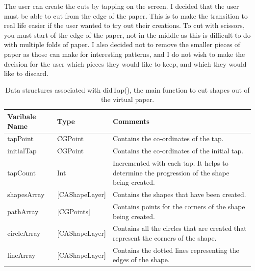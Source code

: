 \documentclass[11pt]{article}
\begin{document}
                 The user can create the cuts by tapping on the screen. I decided that the user must be able to cut from the edge of the paper. This is to make the transition to real life easier if the user wanted to try out their creations. To cut with scissors, you must start of the edge of the paper, not in the middle as this is difficult to do with multiple folds of paper. I also decided not to remove the smaller pieces of paper as those can make for interesting patterns, and I do not wish to make the decision for the user which pieces they would like to keep, and which they would like to discard.
                 
                 \begin{table}[h!]
                      \begin{center}
                      \caption{Data structures associated with didTap(), the main function to cut shapes out of the virtual paper.}
                      \label{tab:table1}
                        \begin{tabular}{|l|l|p{8cm}|}\hline
                          \textbf{Varibale Name} & \textbf{Type} & \textbf{Comments}\\\hline
                          tapPoint & CGPoint \centering & Contains the co-ordinates of the tap.\\\hline
                          initialTap & CGPoint & Contains the co-ordinates of the initial tap.\\\hline
                          tapCount & Int & Incremented with each tap. It helps to determine the progression of the shape being created.\\\hline
                          shapesArray & [CAShapeLayer] & Contains the shapes that have been created.\\\hline
                          pathArray & [CGPoints] & Contains points for the corners of the shape being created.\\\hline
                          circleArray & [CAShapeLayer] & Contains all the circles that are created that represent the corners of the shape.\\\hline
                          lineArray & [CAShapeLayer] & Contains the dotted lines representing the edges of the shape.\\\hline
                         
                        \end{tabular}
                      \end{center}
                    \end{table}
                    
\end{document}
